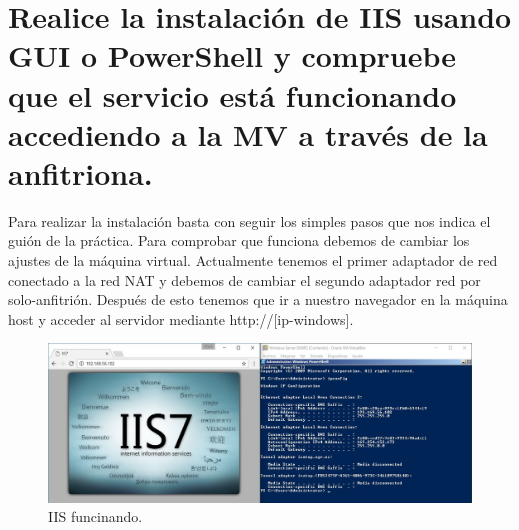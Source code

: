 \section{Realice la instalación de IIS usando GUI o PowerShell y compruebe que el servicio está funcionando accediendo a la MV a través de la anfitriona.}
Para realizar la instalación basta con seguir los simples pasos que nos indica el guión de la práctica. Para comprobar que funciona debemos de cambiar los ajustes de la máquina virtual. Actualmente tenemos el primer adaptador de red conectado a la red NAT y debemos de cambiar el segundo adaptador red por solo-anfitrión. Después de esto tenemos que ir a nuestro navegador en la máquina host y acceder al servidor mediante http://[ip-windows].
\begin{figure}[H]
	\centering
	\includegraphics[scale=0.5]{iis.jpg}
	\caption{IIS funcinando. \label{fig:figura31}}
\end{figure}

